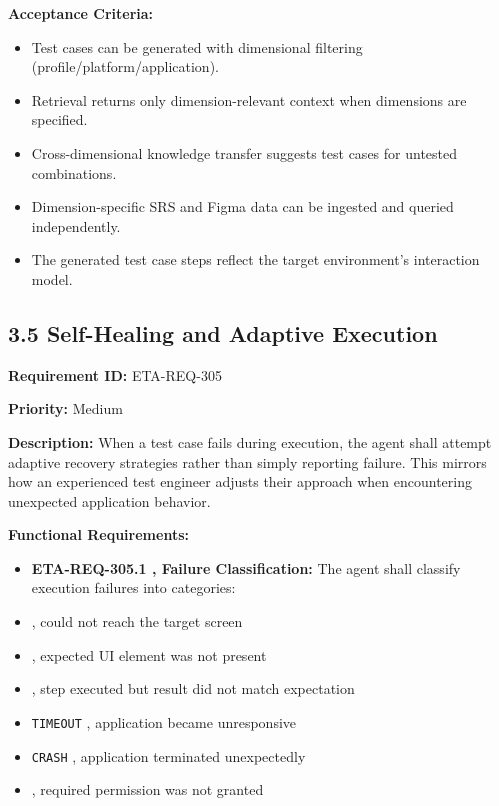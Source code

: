 \textbf{Acceptance Criteria:}
\begin{itemize}[leftmargin=1.4em,itemsep=1pt,topsep=3pt]
  \item Test cases can be generated with dimensional filtering (profile/platform/application).
  \item Retrieval returns only dimension-relevant context when dimensions are specified.
  \item Cross-dimensional knowledge transfer suggests test cases for untested combinations.
  \item Dimension-specific SRS and Figma data can be ingested and queried independently.
  \item The generated test case steps reflect the target environment's interaction model.
\end{itemize}

\subsection*{3.5 Self-Healing and Adaptive Execution}

\textbf{Requirement ID:} ETA-REQ-305

\textbf{Priority:} Medium

\textbf{Description:}
When a test case fails during execution, the agent shall attempt adaptive recovery strategies rather than simply reporting failure. This mirrors how an experienced test engineer adjusts their approach when encountering unexpected application behavior.

\textbf{Functional Requirements:}

\begin{itemize}[leftmargin=1.4em,itemsep=1pt,topsep=3pt]
  \item \textbf{ETA-REQ-305.1 ,  Failure Classification:} The agent shall classify execution failures into categories:
  \item {} ,  could not reach the target screen
  \item {} ,  expected UI element was not present
  \item {} ,  step executed but result did not match expectation
  \item \texttt{TIMEOUT} ,  application became unresponsive
  \item \texttt{CRASH} ,  application terminated unexpectedly
  \item {} ,  required permission was not granted
\end{itemize}

